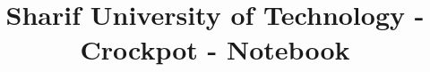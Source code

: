 \documentclass[10pt]{article}
\title{\vspace{-4ex}\Large{Sharif University of Technology - Crockpot - Notebook}}
\author{}
\date{}
\begin{document}
\begin{landscape}
\begin{multicols}{2}

\maketitle
\vspace{-13ex}
{
\baselineskip
\tableofcontents
}
\pagestyle{fancy}



\end{multicols}
\end{landscape}
\end{document}
